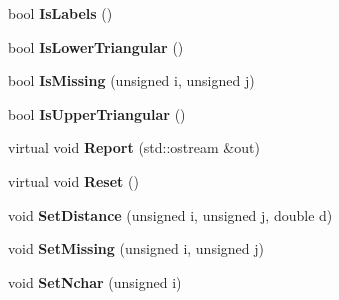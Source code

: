 \begin{DoxyCompactItemize}
\item 
\hypertarget{classNxsDistancesBlock_af6063bb6cf45bee5590144adcab89673}{
bool {\bfseries IsLabels} ()}
\label{classNxsDistancesBlock_af6063bb6cf45bee5590144adcab89673}

\item 
\hypertarget{classNxsDistancesBlock_a454ff6c246f432f417f623fff68ca25d}{
bool {\bfseries IsLowerTriangular} ()}
\label{classNxsDistancesBlock_a454ff6c246f432f417f623fff68ca25d}

\item 
\hypertarget{classNxsDistancesBlock_aca14b29ff8132f68642f61c85bda31c1}{
bool {\bfseries IsMissing} (unsigned i, unsigned j)}
\label{classNxsDistancesBlock_aca14b29ff8132f68642f61c85bda31c1}

\item 
\hypertarget{classNxsDistancesBlock_a444b5d2109eb9d6120f7d8e00015b7ee}{
bool {\bfseries IsUpperTriangular} ()}
\label{classNxsDistancesBlock_a444b5d2109eb9d6120f7d8e00015b7ee}

\item 
\hypertarget{classNxsDistancesBlock_a2ae3df65eb0e820b0cd775ed250ee274}{
virtual void {\bfseries Report} (std::ostream \&out)}
\label{classNxsDistancesBlock_a2ae3df65eb0e820b0cd775ed250ee274}

\item 
\hypertarget{classNxsDistancesBlock_a67ad7aa8d41ab4c501b0955190eecdb4}{
virtual void {\bfseries Reset} ()}
\label{classNxsDistancesBlock_a67ad7aa8d41ab4c501b0955190eecdb4}

\item 
\hypertarget{classNxsDistancesBlock_abf60adc4c72d7cd3f9d618f5fc523dae}{
void {\bfseries SetDistance} (unsigned i, unsigned j, double d)}
\label{classNxsDistancesBlock_abf60adc4c72d7cd3f9d618f5fc523dae}

\item 
\hypertarget{classNxsDistancesBlock_adcdbab373c50bbb880fb1135ddd49318}{
void {\bfseries SetMissing} (unsigned i, unsigned j)}
\label{classNxsDistancesBlock_adcdbab373c50bbb880fb1135ddd49318}

\item 
\hypertarget{classNxsDistancesBlock_af6751142a49be625373bd1900aa6764a}{
void {\bfseries SetNchar} (unsigned i)}
\label{classNxsDistancesBlock_af6751142a49be625373bd1900aa6764a}

\end{DoxyCompactItemize}
